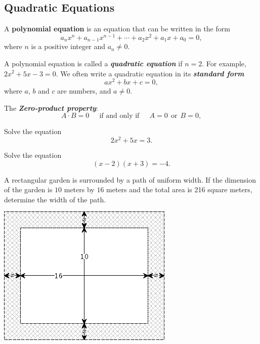 \hypertarget{quadratic-equations}{%
\subsection{Quadratic Equations}\label{quadratic-equations}}

A \textbf{polynomial equation} is an equation that can be written in the
form \[
a_{n}x^{n}+a_{n-1}x^{n-1}+\cdots+a_{2}x^{2}+a_{1}x+a_{0}=0,
\] where \(n\) is a positive integer and \(a_n\ne 0\).

A polynomial equation is called a \textbf{\emph{quadratic equation}} if
\(n=2\). For example, \(2x^2+5x-3=0\). We often write a quadratic
equation in its \textbf{\emph{standard form}} \[a x^2+bx+c=0,\] where
\(a\), \(b\) and \(c\) are numbers, and \(a\neq 0\).

The \textbf{\emph{Zero-product
property}}:
\[A\cdot B=0 \quad ~~\text{if and only if}~~  \quad A=0 ~~\text{or}~~ B=0,\]


\begin{example}
Solve the equation \[2x^2+5x=3.\]
\end{example}
\vspace*{5\baselineskip}

\begin{example}
Solve the equation \[(x-2)(x+3)=-4.\]
\end{example}
\vspace*{5\baselineskip}

\begin{example}
A rectangular garden is surrounded by a path of uniform width. If the
dimension of the garden is \(10\) meters by \(16\) meters and the total
area is 216 square meters, determine the width of the path.

\includegraphics{figs/tikz-rectangular-uniform-width.png}\\
\end{example}
\vspace*{5\baselineskip}

